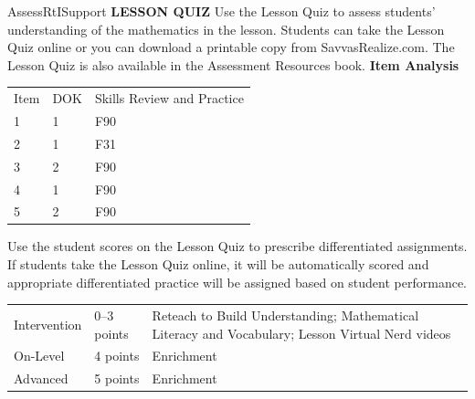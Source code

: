 \documentclass{article}
\newenvironment{te-addendum}[2]{}{}     %
\begin{document}
\begin{te-addendum}{Assess}{RtISupport}
\textbf{LESSON QUIZ}
Use the Lesson Quiz to assess students' understanding of the mathematics in the lesson.
Students can take the Lesson Quiz online or you can download a printable copy from SavvasRealize.com. The Lesson Quiz is also available in the Assessment Resources book.
\textbf{Item Analysis}
\begin{tabular}{lll}
Item & DOK & Skills Review and Practice \\
1 & 1 & F90 \\
2 & 1 & F31 \\
3 & 2 & F90 \\
4 & 1 & F90 \\
5 & 2 & F90 \\
\end{tabular}
Use the student scores on the Lesson Quiz to prescribe differentiated assignments.
If students take the Lesson Quiz online, it will be automatically scored and appropriate differentiated practice will be assigned based on student performance.
\begin{tabular}{lll}
Intervention & 0--3 points & Reteach to Build Understanding; Mathematical Literacy and Vocabulary; Lesson Virtual Nerd videos \\
On-Level & 4 points & Enrichment \\
Advanced & 5 points & Enrichment \\
\end{tabular}
\end{te-addendum}
\end{document}
